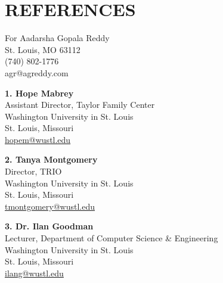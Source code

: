 \documentclass[10pt, letterpaper]{article}
\begin{document}
\vspace{\headerSpacing}
\section*{REFERENCES}

\vspace{\headerSpacing}
\begin{onecolentry}
	For Aadarsha Gopala Reddy\\
	St. Louis, MO 63112\\
	(740) 802-1776\\
	agr@agreddy.com\\
\end{onecolentry}

\vspace{\headerSpacing}
\begin{onecolentry}
	\textbf{1. Hope Mabrey}\\
	Assistant Director, Taylor Family Center\\
	Washington University in St. Louis\\
	St. Louis, Missouri\\
	\href{mailto:hopem@wustl.edu}{hopem@wustl.edu}
\end{onecolentry}

\vspace{\headerSpacing}
\begin{onecolentry}
	\textbf{2. Tanya Montgomery}\\
	Director, TRIO\\
	Washington University in St. Louis\\
	St. Louis, Missouri\\
	\href{mailto:tmontgomery@wustl.edu}{tmontgomery@wustl.edu}
\end{onecolentry}

\vspace{\headerSpacing}
\begin{onecolentry}
	\textbf{3. Dr. Ilan Goodman}\\
	Lecturer, Department of Computer Science \& Engineering\\
	Washington University in St. Louis\\
	St. Louis, Missouri\\
	\href{mailto:ilang@wustl.edu}{ilang@wustl.edu}
\end{onecolentry}
\end{document}
